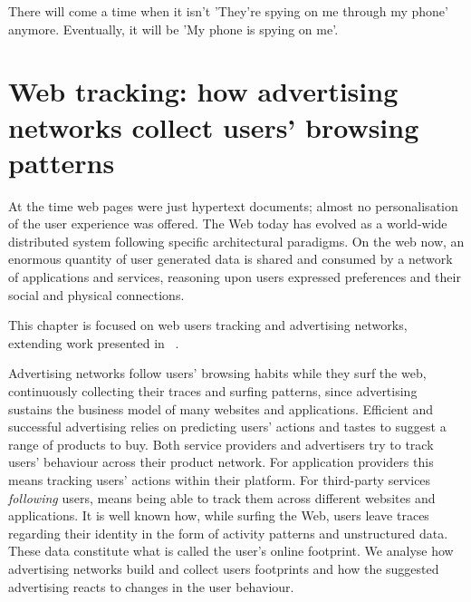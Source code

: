 \begin{savequote}[75mm]
There will come a time when it isn't 'They're spying on me through my phone' anymore. Eventually, it will be 'My phone is spying on me'.
\end{savequote}

\chapter{Web tracking: how advertising networks collect users' browsing patterns}

 At the time web pages were just hypertext documents; almost no personalisation of the user experience was offered. The Web today has evolved as a world-wide distributed system following specific architectural paradigms. On the web now, an enormous quantity of user generated data is shared and consumed by a network of applications and services, reasoning upon users expressed preferences and their social and physical connections. 

This chapter is focused on web users tracking and advertising networks, extending work presented in ~\cite{puglisi2016web, puglisi2015you, puglisi2017web}.

Advertising networks follow users' browsing habits while they surf the web, continuously collecting their traces and surfing patterns, since advertising sustains the business model of many websites and applications. Efficient and successful advertising relies on predicting users' actions and tastes to suggest a range of products to buy. Both service providers and advertisers try to track users' behaviour across their product network. For application providers this means tracking users' actions within their platform. For third-party services \emph{following} users, means being able to track them across different websites and applications. It is well known how, while surfing the Web, users leave traces regarding their identity in the form of activity patterns and unstructured data. These data constitute what is called the user's online footprint. We analyse how advertising networks build and collect users footprints and how the suggested advertising reacts to changes in the user behaviour.

